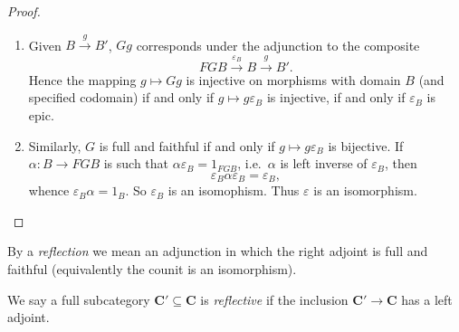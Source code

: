 \documentclass[a4paper]{article}
\renewcommand{\c}[1]{\mathbf{#1}}
\begin{document}
\begin{proof}\leavevmode
  \begin{enumerate}
  \item Given \(B \xrightarrow{g} B'\), \(Gg\) corresponds under the adjunction to the composite
    \[
      FGB \xrightarrow{\varepsilon_B} B \xrightarrow{g} B'.
    \]
    Hence the mapping \(g \mapsto Gg\) is injective on morphisms with domain \(B\) (and specified codomain) if and only if \(g \mapsto g\varepsilon_B\) is injective, if and only if \(\varepsilon_B\) is epic.
  \item Similarly, \(G\) is full and faithful if and only if \(g \mapsto g\varepsilon_B\) is bijective. If \(\alpha: B \to FGB\) is such that \(\alpha\varepsilon_B = 1_{FGB}\), i.e.\ \(\alpha\) is left inverse of \(\varepsilon_B\), then
    \[
      \varepsilon_B\alpha \varepsilon_B = \varepsilon_B,
    \]
    whence \(\varepsilon_B\alpha = 1_B\). So \(\varepsilon_B\) is an isomophism. Thus \(\varepsilon\) is an isomorphism.
  \end{enumerate}
\end{proof}

\begin{definition}
  By a \emph{reflection} we mean an adjunction in which the right adjoint is full and faithful (equivalently the counit is an isomorphism).

  We say a full subcategory \(\c C' \subseteq \c C\) is \emph{reflective} if the inclusion \(\c C' \to \c C\) has a left adjoint.
\end{definition}
\end{document}
